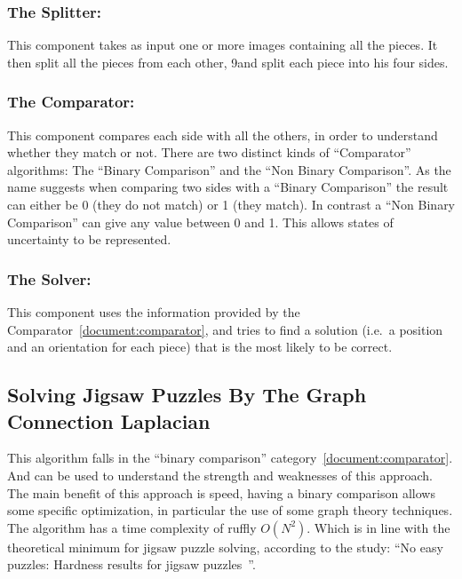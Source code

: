 \documentclass{article}
\newenvironment{indented_section}
  {\adjustwidth{3em}{0pt}}
  {\endadjustwidth}
\begin{document}
\begin{indented_section}

    \subsubsection{The Splitter:} This component takes as input one or more images
    containing all the pieces. It then split all the pieces from each other,
    9and split each piece into his four sides.\label{document:splitter}

    \subsubsection{The Comparator:} This component compares each side with all the
    others, in order to understand whether they match or not.\newline
    There are two distinct kinds of “Comparator” algorithms:
    The “Binary Comparison” and the “Non Binary Comparison”.
    As the name suggests when comparing two sides with a “Binary Comparison”
    the result can either be 0 (they do not match) or 1 (they match).
    In contrast a “Non Binary Comparison” can give any value between 0 and 1.
    This allows states of uncertainty to be represented.\label{document:comparator}

    \subsubsection{The Solver:} This component  uses the information provided by the
    Comparator~\ref{document:comparator}, and tries to find a solution
    (i.e.\ a position and an orientation for each piece)
    that is the most likely to be correct.\label{document:solver}

\end{indented_section}

\subsection{Solving Jigsaw Puzzles By The Graph Connection Laplacian~\cite{GCL}}
This algorithm falls in the “binary comparison” category~\ref{document:comparator}.
And can be used to understand the strength and weaknesses
of this approach.\newline
The main benefit of this approach is speed,  having a binary comparison allows
some specific optimization, in particular the use of some graph theory techniques.\newline
The  algorithm has a time complexity of ruffly \(O(N^2)\). Which is in line with the theoretical
minimum for jigsaw puzzle solving, according to the study:
\footnotesize{“No easy puzzles: Hardness results for jigsaw puzzles~\cite{ON2Claim}”}. 
\end{document}
